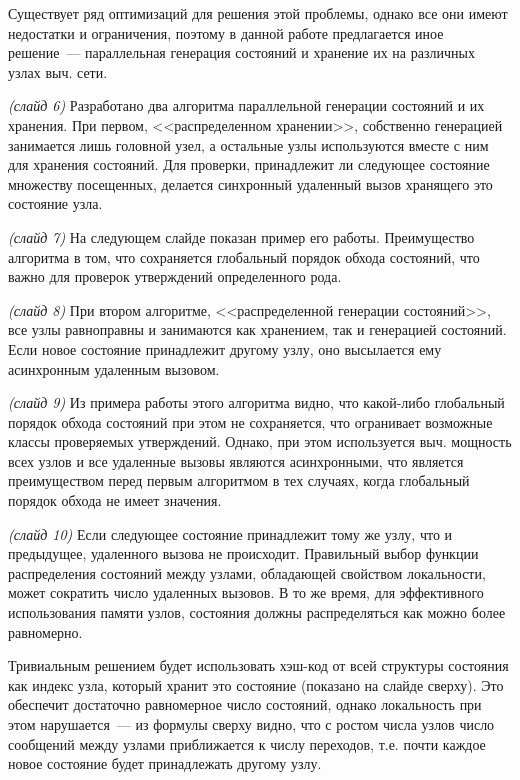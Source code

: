 \documentclass[a4paper,12pt,notitlepage]{article}
\begin{document}
Существует ряд оптимизаций для решения этой проблемы, однако все они имеют недостатки и
ограничения, поэтому в данной работе предлагается иное решение~--- параллельная генерация
состояний и хранение их на различных узлах выч. сети.

\emph{(слайд 6)} Разработано два алгоритма параллельной генерации состояний и их
хранения. При первом, <<распределенном хранении>>, собственно генерацией занимается лишь
головной узел, а остальные узлы используются вместе с ним для хранения состояний. Для
проверки, принадлежит ли следующее состояние множеству посещенных, делается синхронный
удаленный вызов хранящего это состояние узла.

\emph{(слайд 7)} На следующем слайде показан пример его работы. Преимущество алгоритма в
том, что сохраняется глобальный порядок обхода состояний, что важно для проверок
утверждений определенного рода. %

\emph{(слайд 8)} При втором алгоритме, <<распределенной генерации состояний>>, все узлы
равноправны и занимаются как хранением, так и генерацией состояний. Если новое состояние
принадлежит другому узлу, оно высылается ему асинхронным удаленным вызовом. 

\emph{(слайд 9)} Из примера работы этого алгоритма видно, что какой-либо глобальный
порядок обхода состояний при этом не сохраняется, что огранивает возможные классы
проверяемых утверждений. Однако, при этом используется выч. мощность всех узлов и все
удаленные вызовы являются асинхронными, что является преимуществом перед первым алгоритмом
в тех случаях, когда глобальный порядок обхода не имеет значения.

\emph{(слайд 10)} Если следующее состояние принадлежит тому же узлу, что и предыдущее,
удаленного вызова не происходит. Правильный выбор функции распределения состояний между
узлами, обладающей свойством локальности, может сократить число удаленных вызовов. В то же
время, для эффективного использования памяти узлов, состояния должны распределяться как
можно более равномерно.

Тривиальным решением будет использовать хэш-код от всей структуры состояния как индекс
узла, который хранит это состояние (показано на слайде сверху). Это обеспечит достаточно
равномерное число состояний, однако локальность при этом нарушается~--- из формулы сверху
видно, что с ростом числа узлов число сообщений между узлами приближается к числу
переходов, т.е. почти каждое новое состояние будет принадлежать другому узлу.
\end{document}
